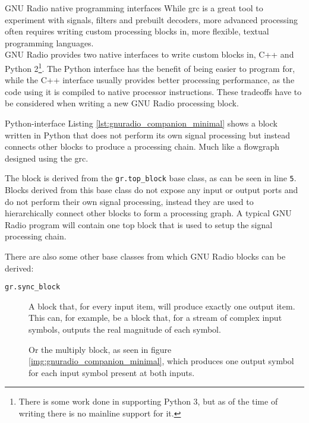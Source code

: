 \begin{subchapter}{GNU Radio native programming interfaces}
  While \gls{grc} is a great tool to experiment with signals,
  filters and prebuilt decoders, more advanced processing
  often requires writing custom processing blocks in, more flexible,
  textual programming languages. \\

  GNU Radio provides two native interfaces to write custom
  blocks in, C++ and Python 2\footnote{There is some work done
  in supporting Python 3, but as of the time of writing there is no
  mainline support for it.}.
  The Python interface has the benefit of being easier to program
  for, while the C++ interface usually provides better processing performance,
  as the code using it is compiled to native processor instructions.
  These tradeoffs have to be considered when writing a
  new GNU Radio processing block.

  \begin{subsubchapter}{Python-interface}
    Listing \ref{lst:gnuradio_companion_minimal} shows a block written
    in Python that does not perform its own signal processing but
    instead connects other blocks to produce a processing chain.
    Much like a flowgraph designed using the \gls{grc}.

    The block is derived from the \texttt{gr.top\_block} base class,
    as can be seen in line \texttt{5}. Blocks derived from this base class
    do not expose any input or output ports and do not perform their own
    signal processing, instead they are used to hierarchically connect
    other blocks to form a processing graph.
    A typical GNU Radio program will contain one top block that is
    used to setup the signal processing chain.

    There are also some other base classes from which GNU Radio
    blocks can be derived\cite{grblockscodingguide}:

    \begin{description}
      \item[\texttt{gr.sync\_block}]
        A block that, for every input item, will produce exactly
        one output item. This can, for example, be a block that,
        for a stream of complex input symbols, outputs the real
        magnitude of each symbol.

        Or the multiply block, as seen in figure
        \ref{img:gnuradio_companion_minimal}, which produces one
        output symbol for each input symbol present at both inputs.


\end{description}
\end{subsubchapter}
\end{subchapter}
